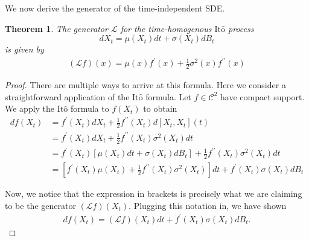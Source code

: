 \documentclass[12pt]{article}
\newcommand{\state}[1][t]{X_{#1}}
\newcommand{\BM}[1][t]{B_{#1}} %
\newcommand{\gen}{\mathcal{L}} %
\newcommand{\ito}{\text{It}\hat{\text{o}}}
\newtheorem{thm}{Theorem}
\begin{document}
We now derive the generator of the time-independent SDE. 
\begin{thm} 
The generator $\gen$ for the time-homogenous $\ito$ process 
\[ d\state = \mu(\state) dt + \sigma(\state) d\BM \] 
is given by 
\begin{align}
(\gen f)(x) = \mu(x) f^\prime(x) + \frac{1}{2} \sigma^2(x) f^{\prime\prime}(x) 
\end{align}

\end{thm}

\begin{proof} 
There are multiple ways to arrive at this formula. Here we consider a straightforward application of the $\ito$ formula. Let $f \in \mathcal{C}^2$ have compact support. 
We apply the $\ito$ formula to $f(\state)$ to obtain 
\begin{align*}
df(\state)
&= f^\prime(\state) d\state + \frac{1}{2} f^{\prime\prime}(\state) d[\state, \state](t) \\
&= f^\prime(\state) d\state + \frac{1}{2} f^{\prime\prime}(\state) \sigma^2(\state) dt \\
&= f^\prime(\state) \left[\mu(\state) dt + \sigma(\state) d\BM \right] + \frac{1}{2} f^{\prime\prime}(\state) \sigma^2(\state) dt \\
&= \left[f^\prime(\state)\mu(\state) +  \frac{1}{2} f^{\prime\prime}(\state) \sigma^2(\state) \right] dt + f^\prime(\state) \sigma(\state) d\BM
\end{align*}

Now, we notice that the expression in brackets is precisely what we are claiming to be the generator $(\gen f)(\state)$. Plugging this notation in, we have shown
\begin{align}
df(\state) = (\gen f)(\state) dt +  f^\prime(\state) \sigma(\state) d\BM. \label{Ito_formula_generator}
\end{align}


\end{proof}
\end{document}
